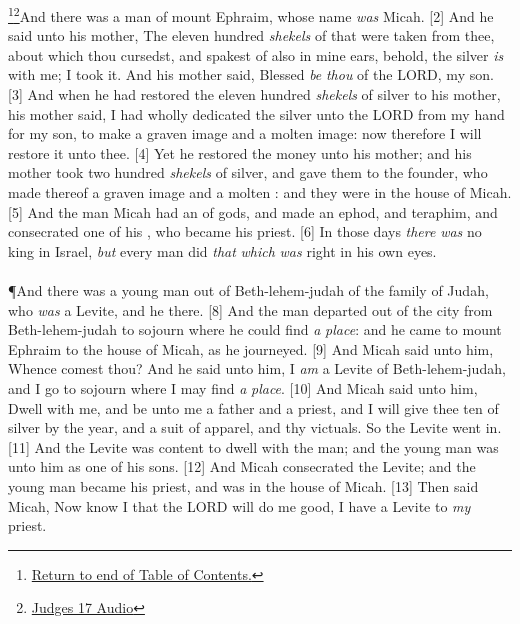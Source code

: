 \footnote{\textcolor[rgb]{0.00,0.25,0.00}{\hyperlink{TOC}{Return to end of Table of Contents.}}}\footnote{\href{https://audiobible.com/bible/judges_17.html}{\textcolor[cmyk]{0.99998,1,0,0}{Judges 17 Audio}}}\textcolor[cmyk]{0.99998,1,0,0}{And there was a man of mount Ephraim, whose name \emph{was} Micah.}
[2] \textcolor[cmyk]{0.99998,1,0,0}{And he said unto his mother, The eleven hundred \emph{shekels} of  that were taken from thee, about which thou cursedst, and spakest of also in mine ears, behold, the silver \emph{is} with me; I took it. And his mother said, Blessed \emph{be} \emph{thou} of the LORD, my son.}
[3] \textcolor[cmyk]{0.99998,1,0,0}{And when he had restored the eleven hundred \emph{shekels} of silver to his mother, his mother said, I had wholly dedicated the silver unto the LORD from my hand for my son, to make a graven image and a molten image: now therefore I will restore it unto thee.}
[4] \textcolor[cmyk]{0.99998,1,0,0}{Yet he restored the money unto his mother; and his mother took two hundred \emph{shekels} of silver, and gave them to the founder, who made thereof a graven image and a molten : and they were in the house of Micah.}
[5] \textcolor[cmyk]{0.99998,1,0,0}{And the man Micah had an  of gods, and made an ephod, and teraphim, and consecrated one of his , who became his priest.}
[6] \textcolor[cmyk]{0.99998,1,0,0}{In those days \emph{there} \emph{was} no king in Israel, \emph{but} every man did \emph{that} \emph{which} \emph{was} right in his own eyes.}\\
\\
\P\textcolor[cmyk]{0.99998,1,0,0}{And there was a young man out of Beth-lehem-judah of the family of Judah, who \emph{was} a Levite, and he  there.}
[8] \textcolor[cmyk]{0.99998,1,0,0}{And the man departed out of the city from Beth-lehem-judah to sojourn where he could find \emph{a} \emph{place}: and he came to mount Ephraim to the house of Micah, as he journeyed.}
[9] \textcolor[cmyk]{0.99998,1,0,0}{And Micah said unto him, Whence comest thou? And he said unto him, I \emph{am} a Levite of Beth-lehem-judah, and I go to sojourn where I may find \emph{a} \emph{place}.}
[10] \textcolor[cmyk]{0.99998,1,0,0}{And Micah said unto him, Dwell with me, and be unto me a father and a priest, and I will give thee ten  of silver by the year, and a suit of apparel, and thy victuals. So the Levite went in.}
[11] \textcolor[cmyk]{0.99998,1,0,0}{And the Levite was content to dwell with the man; and the young man was unto him as one of his sons.}
[12] \textcolor[cmyk]{0.99998,1,0,0}{And Micah consecrated the Levite; and the young man became his priest, and was in the house of Micah.}
[13] \textcolor[cmyk]{0.99998,1,0,0}{Then said Micah, Now know I that the LORD will do me good,  I have a Levite to \emph{my} priest.}